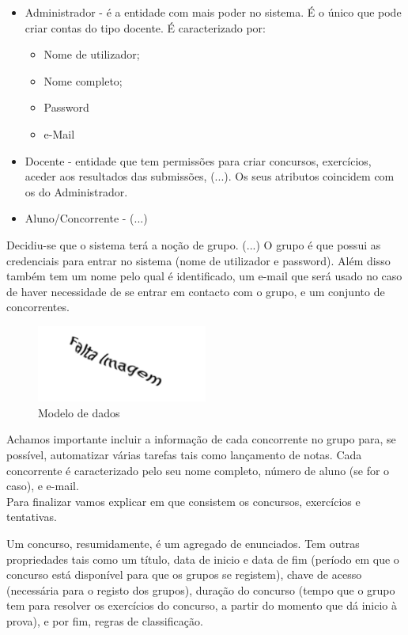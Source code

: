 \begin{itemize}
  \item Administrador - é a entidade com mais poder no sistema. É o único que pode criar contas do tipo docente. É caracterizado por:
    \begin{itemize}
      \item Nome de utilizador;
      \item Nome completo;
      \item Password
      \item e-Mail
    \end{itemize}
  \item Docente - entidade que tem permissões para criar concursos, exercícios, aceder aos resultados das submissões, (...). Os seus atributos coincidem com os do Administrador.
  \item Aluno/Concorrente - (...)
\end{itemize}

Decidiu-se que o sistema terá a noção de grupo. 
(...)
O grupo é que possui as credenciais para entrar no sistema (nome de utilizador e password). 
Além disso também tem um nome pelo qual é identificado, um e-mail que será usado no caso de haver necessidade de se entrar em contacto com o grupo, e um conjunto de concorrentes.\\

\begin{figure}[htbp]
\begin{center}
\includegraphics[width=0.5\textwidth]{Images/missimage}
\caption{Modelo de dados}\label{fig modedados}
\end{center}
\end{figure}

Achamos importante incluir a informação de cada concorrente no grupo para, se possível, automatizar várias tarefas tais como lançamento de notas.
Cada concorrente é caracterizado pelo seu nome completo, número de aluno (se for o caso), e e-mail.\\

Para finalizar vamos explicar em que consistem os concursos, exercícios e tentativas.

Um concurso, resumidamente, é um agregado de enunciados. 
Tem outras propriedades tais como um título, data de inicio e data de fim (período em que o concurso está disponível para que os grupos se registem), 
chave de acesso (necessária para o registo dos grupos), duração do concurso (tempo que o grupo tem para resolver os exercícios do concurso, 
a partir do momento que dá inicio à prova), e por fim, regras de classificação.\\

